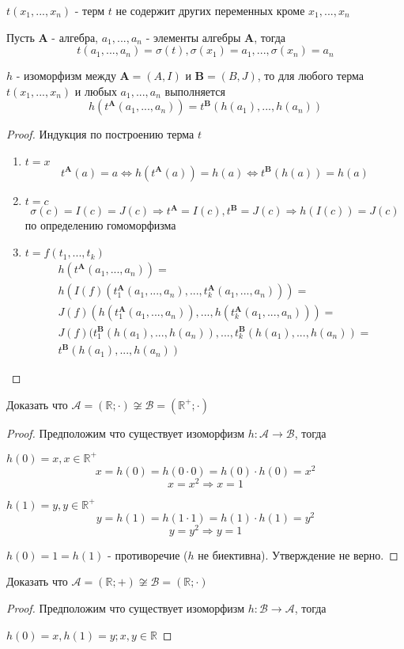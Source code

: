 \documentclass[../main/document.tex]{subfiles}
\begin{document}
\begin{dfn}
$t(x_1,...,x_n)$ - терм $t$ не содержит других переменных кроме $x_1,...,x_n$
\end{dfn}
\begin{dfn}
Пусть $\mathbf{A}$ - алгебра, $a_1,...,a_n$ - элементы алгебры $\mathbf{A}$, тогда
$$t(a_1,...,a_n)=\sigma(t), \sigma(x_1)=a_1,...,\sigma(x_n)=a_n$$
\end{dfn}
\begin{thm}
$h$ - изоморфизм между $\mathbf{A}=(A,I)$ и $\mathbf{B}=(B,J)$, то для любого терма $t(x_1,...,x_n)$ и любых $a_1,...,a_n$ выполняется
$$h(t^{\mathbf{A}}(a_1,...,a_n))=t^{\mathbf{B}}(h(a_1),...,h(a_n))$$
\end{thm}
\begin{proof}
Индукция по построению терма $t$
\begin{enumerate}
\item $t=x$
$$t^{\mathbf{A}}(a)=a\Leftrightarrow h(t^{\mathbf{A}}(a))=h(a)\Leftrightarrow t^{\mathbf{B}}(h(a))=h(a)$$
\item $t=c$
$$\sigma(c)=I(c)=J(c)\Rightarrow t^{\mathbf{A}}=I(c), t^{\mathbf{B}}=J(c)\Rightarrow h(I(c))=J(c)$$
по определению гомоморфизма
\item $t=f(t_1,...,t_k)$
\begin{multline*}
h(t^{\mathbf{A}}(a_1,...,a_n))=\\
h(I(f)(t^{\mathbf{A}}_{1}(a_1,...,a_n),...,t^{\mathbf{A}}_{k}(a_1,...,a_n)))=\\
J(f)(h(t^{\mathbf{A}}_{1}(a_1,...,a_n)),...,h(t^{\mathbf{A}}_{k}(a_1,...,a_n)))=\\
J(f)(t^{\mathbf{B}}_{1}(h(a_1),...,h(a_n)),...,t^{\mathbf{B}}_{k}(h(a_1),...,h(a_n))=\\
t^{\mathbf{B}}(h(a_1),...,h(a_n))
\end{multline*}
\end{enumerate}
\end{proof}
\begin{exm}
Доказать что $\mathcal{A}=(\mathbb{R};\cdot)\not\cong\mathcal{B}=(\mathbb{R}^{+};\cdot)$
\begin{proof}
Предположим что существует изоморфизм $h:\mathcal{A}\rightarrow \mathcal{B}$, тогда

$h(0)=x, x\in \mathbb{R}^{+}$
$$x=h(0)=h(0\cdot 0)=h(0)\cdot h(0)=x^2$$
$$x=x^2\Rightarrow x=1$$

$h(1)=y, y\in \mathbb{R}^{+} $
$$y=h(1)=h(1\cdot 1)=h(1)\cdot h(1)=y^2$$
$$y=y^2\Rightarrow y=1$$

$h(0)=1=h(1)$ - противоречие ($h$ не биективна). Утверждение не верно.
\end{proof}
\end{exm}
\begin{exm}
Доказать что $\mathcal{A}=(\mathbb{R};+)\not\cong\mathcal{B}=(\mathbb{R};\cdot)$
\begin{proof}
Предположим что существует изоморфизм $h:\mathcal{B}\rightarrow \mathcal{A}$, тогда

$h(0)=x, h(1)=y; x,y\in \mathbb{R}$
\end{proof}
\end{exm}


\end{document}
